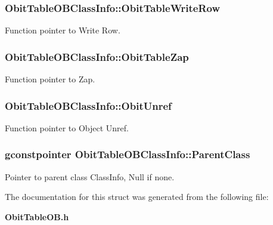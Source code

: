 \subsubsection{ {\bf Obit\-Table\-OBClass\-Info::Obit\-Table\-Write\-Row}}\label{structObitTableOBClassInfo_o26}


Function pointer to Write Row. 

\subsubsection{ {\bf Obit\-Table\-OBClass\-Info::Obit\-Table\-Zap}}\label{structObitTableOBClassInfo_o19}


Function pointer to Zap. 

\subsubsection{ {\bf Obit\-Table\-OBClass\-Info::Obit\-Unref}}\label{structObitTableOBClassInfo_o11}


Function pointer to Object Unref. 

\subsubsection{\setlength{\rightskip}{0pt plus 5cm}gconstpointer {\bf Obit\-Table\-OBClass\-Info::Parent\-Class}}\label{structObitTableOBClassInfo_o3}


Pointer to parent class Class\-Info, Null if none. 



The documentation for this struct was generated from the following file:\begin{CompactItemize}
\item 
{\bf Obit\-Table\-OB.h}\end{CompactItemize}
